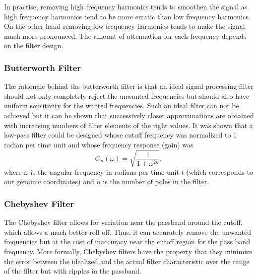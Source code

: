 In practise, removing high frequency harmonics tends to smoothen the signal as high frequency harmonics tend to be more erratic than low frequency harmonics. On the other hand removing low frequency harmonics tends to make the signal much more pronounced. The amount of attenuation for each frequency depends on the filter design.

\subsubsection{Butterworth Filter}
\label{sec:butterworth.filter}

The rationale behind the butterworth filter is that an ideal signal processing filter should not only completely reject the unwanted frequencies but should also have uniform sensitivity for the wanted frequencies. Such an ideal filter can not be achieved but it can be shown that successively closer approximations are obtained with increasing numbers of filter elements of the right values. It was shown that a low-pass filter could be designed whose cutoff frequency was normalized to $1$ radian per time unit and whose frequency response (gain) was
\begin{equation}
  \label{eq:butterworth1}
  G_n(\omega) = \sqrt{\frac{1}{{1+\omega^{2n}}}},
\end{equation}
where $ \omega $ is the angular frequency in radians per time unit $ t $ (which corresponds to our genomic coordinates) and $n$ is the number of poles in the filter.

\subsubsection{Chebyshev Filter}
\label{sec:chebyshev.filter}

The Chebyshev filter allows for variation near the passband around the cutoff, which allows a much better roll off. Thus, it can accurately remove the unwanted frequencies but at the cost of inaccuracy near the cutoff region for the pass band frequency. More formally, Chebyshev filters have the property that they minimize the error between the idealized and the actual filter characteristic over the range of the filter but with ripples in the passband.

